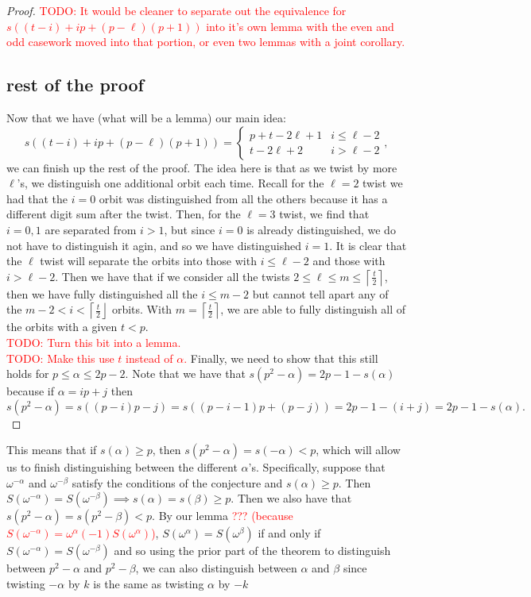 \begin{proof}
\textcolor{red}{TODO: It would be cleaner to separate out the equivalence for $s((t-i)+ip+(p-\ell)(p+1))$ into it's own lemma with the even and odd casework moved into that portion, or even two lemmas with a joint corollary.}
\\

\subsection{rest of the proof}
Now that we have (what will be a lemma) our main idea:
\[ s((t-i)+ip+(p-\ell)(p+1)) = \begin{cases} p + t-2\ell+1 & i \leq \ell - 2 \\ t - 2 \ell + 2 & i > \ell -2\end{cases},\]
we can finish up the rest of the proof.
The idea here is that as we twist by more $\ell$'s, we distinguish one additional orbit each time.
Recall for the $\ell = 2$ twist we had that the $i = 0$ orbit was distinguished from all the others because it has a different digit sum after the twist.
Then, for the $\ell = 3$ twist, we find that $i=0,1$ are separated from $i > 1$, but since $i =0$ is already distinguished, we do not have to distinguish it agin, and so we have distinguished $i = 1$.
It is clear that the $\ell$ twist will separate the orbits into those with $i \leq \ell - 2$ and those with $i > \ell -2$.
Then we have that if we consider all the twists $2 \leq \ell \leq m \leq \left\lceil \frac{t}{2} \right\rceil$, then we have fully distinguished all the $i \leq m-2$ but cannot tell apart any of the $m-2 < i < \left\lceil \frac{t}{2} \right\rfloor$ orbits.
With $m = \left\lceil \frac{t}{2} \right\rceil$, we are able to fully distinguish all of the orbits with a given $t < p$.
\\
\textcolor{red}{TODO: Turn this bit into a lemma.}
\\
\textcolor{red}{TODO: Make this use $t$ instead of $\alpha$.}
Finally, we need to show that this still holds for $p \leq \alpha \leq 2p - 2$. 
Note that we have that $s(p^2 - \alpha) = 2p-1  - s(\alpha)$ because if $\alpha = ip+j$ then \[s(p^2 -\alpha) = s((p-i)p -j) = s((p -i - 1)p + (p-j) )= 2p-1 - (i+j) = 2p - 1 - s(\alpha).\]
\end{proof}

This means that if $s(\alpha) \geq p$, then $s(p^2 - \alpha) = s(-\alpha) < p$, which will allow us to finish distinguishing between the different $\alpha$'s. 
Specifically, suppose that $\omega^{-\alpha}$ and $\omega^{-\beta}$ satisfy the conditions of the conjecture and $s(\alpha) \geq p$. 
Then $S(\omega^{-\alpha}) = S(\omega^{-\beta}) \implies s(\alpha) = s(\beta) \geq p$. 
Then we also have that $s(p^2 - \alpha) = s(p^2 - \beta) < p$. 
By our lemma \textcolor{red}{??? (because $S(\omega^{-\alpha}) = \omega^{\alpha}(-1)S(\omega^{\alpha})$)}, $S(\omega^\alpha) = S(\omega^\beta)$ if and only if $S(\omega^{-\alpha}) = S(\omega^{-\beta})$ and so using the prior part of the theorem to distinguish between $p^2 - \alpha$ and $p^2 - \beta$, we can also distinguish between $\alpha$ and $\beta$ since twisting $-\alpha$ by $k$ is the same as twisting $\alpha$ by $-k$ 

\endinput